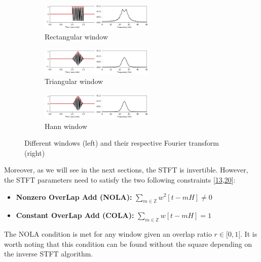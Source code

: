 \documentclass[american,]{article}
\providecommand{\tightlist}{%
  \setlength{\itemsep}{0pt}\setlength{\parskip}{0pt}}
\theoremstyle{definition}
\theoremstyle{definition}
\theoremstyle{definition}
\theoremstyle{remark}
\begin{document}
\begin{figure}[H]
    \centering
    \begin{subfigure}[t]{\textwidth}
        \centering
        \includegraphics[width=0.6\textwidth]{img/w_rectangle.png}
        \caption{Rectangular window}
    \end{subfigure}
    \begin{subfigure}[t]{\textwidth}
        \centering
        \includegraphics[width=0.6\textwidth]{img/w_triangle.png}
        \caption{Triangular window}
    \end{subfigure}
    \begin{subfigure}[t]{\textwidth}
        \centering
        \includegraphics[width=0.6\textwidth]{img/w_hann.png}
        \caption{Hann window}
    \end{subfigure}
    \caption{Different windows (left) and their respective Fourier transform (right)}
\end{figure}

Moreover, as we will see in the next sections, the STFT is invertible.
However, the STFT parameters need to satisfy the two following constraints {[}\protect\hyperlink{ref-griffin1983}{13},\protect\hyperlink{ref-muller2015}{20}{]}:

\begin{itemize}
\tightlist
\item
  \textbf{Nonzero OverLap Add (NOLA):} \(\sum\limits_{m\in\mathbb{Z}} w^2[t-mH] \neq 0\)
\item
  \textbf{Constant OverLap Add (COLA):} \(\sum\limits_{m\in\mathbb{Z}} w[t-mH] = 1\)
\end{itemize}

The NOLA condition is met for any window given an overlap ratio \(r\in[0,1[\).
It is worth noting that this condition can be found without the square
depending on the inverse STFT algorithm.
\end{document}

